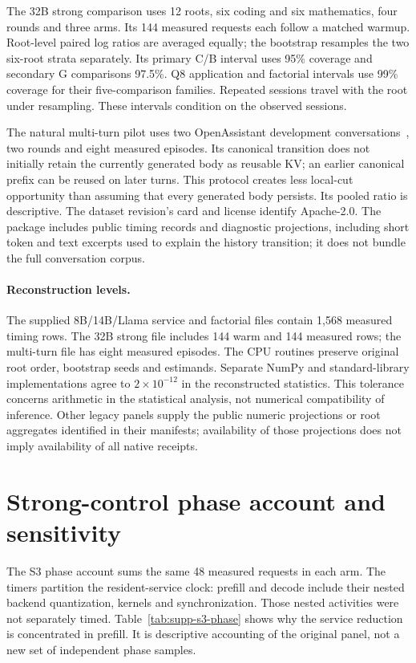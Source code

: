 The 32B strong comparison uses 12 roots, six coding and six mathematics, four rounds and three arms. Its 144 measured requests each follow a matched warmup. Root-level paired log ratios are averaged equally; the bootstrap resamples the two six-root strata separately. Its primary C/B interval uses 95\% coverage and secondary G comparisons 97.5\%. Q8 application and factorial intervals use 99\% coverage for their five-comparison families. Repeated sessions travel with the root under resampling. These intervals condition on the observed sessions.

The natural multi-turn pilot uses two OpenAssistant development conversations~\cite{oasst}, two rounds and eight measured episodes. Its canonical transition does not initially retain the currently generated body as reusable KV; an earlier canonical prefix can be reused on later turns. This protocol creates less local-cut opportunity than assuming that every generated body persists. Its pooled ratio is descriptive. The dataset revision's card and license identify Apache-2.0. The package includes public timing records and diagnostic projections, including short token and text excerpts used to explain the history transition; it does not bundle the full conversation corpus.

\paragraph{Reconstruction levels.}
The supplied 8B/14B/Llama service and factorial files contain 1,568 measured timing rows. The 32B strong file includes 144 warm and 144 measured rows; the multi-turn file has eight measured episodes. The CPU routines preserve original root order, bootstrap seeds and estimands. Separate NumPy and standard-library implementations agree to $2\times10^{-12}$ in the reconstructed statistics. This tolerance concerns arithmetic in the statistical analysis, not numerical compatibility of inference. Other legacy panels supply the public numeric projections or root aggregates identified in their manifests; availability of those projections does not imply availability of all native receipts.

\section{Strong-control phase account and sensitivity}
\label{sec:supp-s3}
The S3 phase account sums the same 48 measured requests in each arm. The timers partition the resident-service clock: prefill and decode include their nested backend quantization, kernels and synchronization. Those nested activities were not separately timed. Table~\ref{tab:supp-s3-phase} shows why the service reduction is concentrated in prefill. It is descriptive accounting of the original panel, not a new set of independent phase samples.

